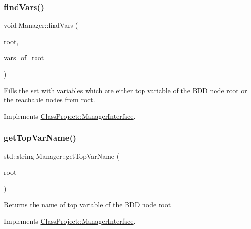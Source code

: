 \mbox{\label{classClassProject_1_1Manager_abf869470f4d1baffca8a140d3196c2ad}} 
\subsubsection{\texorpdfstring{find\+Vars()}{findVars()}}
{\footnotesize\ttfamily void Manager\+::find\+Vars (\begin{DoxyParamCaption}\item[{const B\+D\+D\+\_\+\+ID \&}]{root,  }\item[{std\+::set$<$ B\+D\+D\+\_\+\+ID $>$ \&}]{vars\+\_\+of\+\_\+root }\end{DoxyParamCaption})\hspace{0.3cm}{\ttfamily [virtual]}}

Fills the set with variables which are either top variable of the B\+DD node root or the reachable nodes from root. 

Implements \hyperlink{classClassProject_1_1ManagerInterface_ab94feabca2125d334e542e502ae0186d}{Class\+Project\+::\+Manager\+Interface}.

\mbox{\label{classClassProject_1_1Manager_a72e49c79e186bfce423eb554cca28ff2}} 
\subsubsection{\texorpdfstring{get\+Top\+Var\+Name()}{getTopVarName()}}
{\footnotesize\ttfamily std\+::string Manager\+::get\+Top\+Var\+Name (\begin{DoxyParamCaption}\item[{const B\+D\+D\+\_\+\+ID \&}]{root }\end{DoxyParamCaption})\hspace{0.3cm}{\ttfamily [virtual]}}

\begin{DoxyReturn}{Returns}
the name of top variable of the B\+DD node root 
\end{DoxyReturn}


Implements \hyperlink{classClassProject_1_1ManagerInterface_afde45b2065361dfa6e61c1c7bc3fc1b4}{Class\+Project\+::\+Manager\+Interface}.

